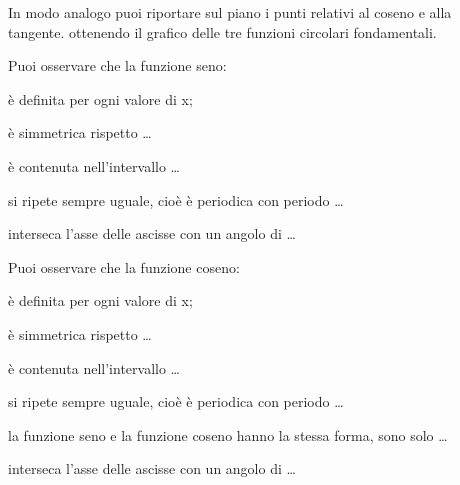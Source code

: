 In modo analogo puoi riportare sul piano i punti relativi al coseno e alla 
tangente. ottenendo il grafico delle tre funzioni circolari fondamentali.

 \vspace{-6pt}
  \begin{center}
\begin{inaccessibleblock}
    
\end{inaccessibleblock}
  \end{center}
Puoi osservare che la funzione seno:
\begin{itemize*}
 \item è definita per ogni valore di x;
 \item è simmetrica rispetto \dots
 \item è contenuta nell'intervallo \dots
 \item si ripete sempre uguale, cioè è periodica con periodo \dots
 \item interseca l'asse delle ascisse con un angolo di \dots
\end{itemize*}
 \vspace{-6pt}
  \begin{center}
  
\begin{inaccessibleblock}
    
\end{inaccessibleblock}
  \end{center}
Puoi osservare che la funzione coseno:
\begin{itemize*}
 \item è definita per ogni valore di x;
 \item è simmetrica rispetto \dots
 \item è contenuta nell'intervallo \dots
 \item si ripete sempre uguale, cioè è periodica con periodo \dots
 \item la funzione seno e la funzione coseno hanno la stessa forma,
  sono solo \dots
 \item interseca l'asse delle ascisse con un angolo di \dots
\end{itemize*}

